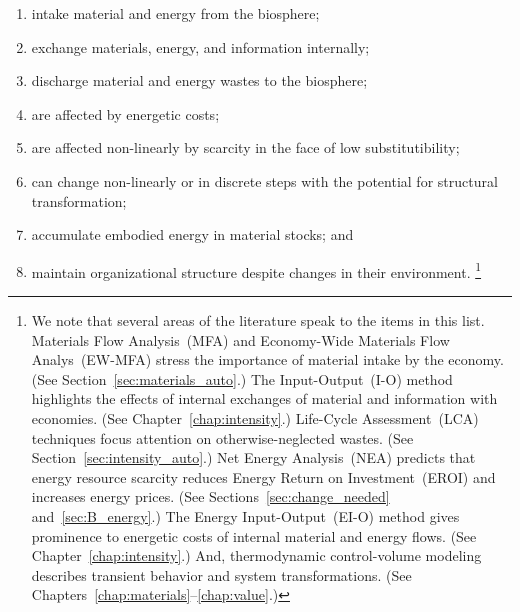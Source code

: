 \begin{enumerate}
	\item{\label{itm:intake}intake material and energy from the biosphere;}
	\item{\label{itm:internal_exchange}exchange materials, energy, and information internally;}
	\item{\label{itm:discharge}discharge material and energy wastes to the biosphere;}
	\item{\label{itm:energetic_costs}are affected by energetic costs;}
	\item{\label{itm:scarcity}are affected non-linearly by scarcity 
			in the face of low substitutibility;}
	\item{\label{itm:non-linear}can change non-linearly or in discrete steps with the potential 
			for structural transformation;}
	\item{\label{itm:embodies}accumulate embodied energy in material stocks; and}
	\item{\label{itm:robust}maintain organizational structure despite changes 
			in their environment.%
				\footnote{We note that 
				several areas of the literature speak to the items in this list.
				Materials Flow Analysis~(MFA) and 
				Economy-Wide Materials Flow Analys~(EW-MFA)
				stress the importance of
				material intake by the economy. 
				(See Section~\ref{sec:materials_auto}.)
				The Input-Output~(I-O) method highlights the effects of internal exchanges
				of material and information with economies. 
				(See Chapter~\ref{chap:intensity}.)
				Life-Cycle Assessment~(LCA) techniques focus attention 
				on otherwise-neglected wastes. 
				(See Section~\ref{sec:intensity_auto}.)
				Net Energy Analysis~(NEA) predicts that energy resource 
				scarcity reduces Energy Return on Investment~(EROI)
				and increases energy prices.
				(See Sections~\ref{sec:change_needed} and~\ref{sec:B_energy}.)
				The Energy Input-Output~(EI-O) method gives prominence to energetic costs
				of internal material and energy flows.
				(See Chapter~\ref{chap:intensity}.)
				And, thermodynamic control-volume modeling describes
				transient behavior and system transformations.
				(See Chapters~\ref{chap:materials}--\ref{chap:value}.)
			}}
\end{enumerate}


